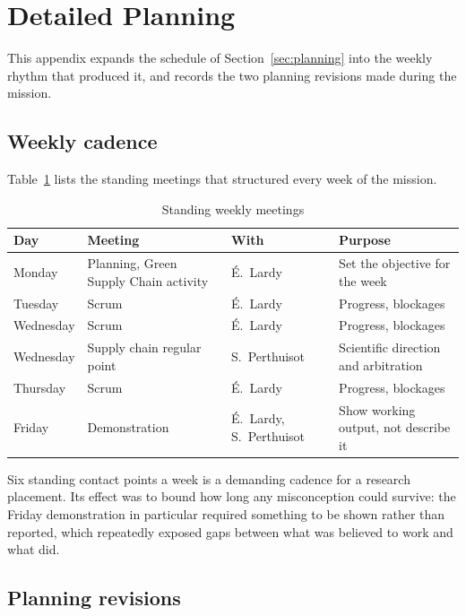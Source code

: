\section{Detailed Planning}
\label{app:planning}

This appendix expands the schedule of Section~\ref{sec:planning} into the weekly rhythm that
produced it, and records the two planning revisions made during the mission.

\subsection*{Weekly cadence}

Table~\ref{tab:cadence} lists the standing meetings that structured every week of the
mission.

\begin{table}[htbp]
\centering
\caption{Standing weekly meetings}
\label{tab:cadence}
\small
\begin{tabularx}{\linewidth}{>{\raggedright\arraybackslash}p{2.2cm} >{\raggedright\arraybackslash}p{3.4cm} >{\raggedright\arraybackslash}p{3.2cm} X}
\toprule
\textbf{Day} & \textbf{Meeting} & \textbf{With} & \textbf{Purpose} \\
\midrule
Monday & Planning, Green Supply Chain activity & \'E.\ Lardy & Set the objective for the
week \\
Tuesday & Scrum & \'E.\ Lardy & Progress, blockages \\
Wednesday & Scrum & \'E.\ Lardy & Progress, blockages \\
Wednesday & Supply chain regular point & S.\ Perthuisot & Scientific direction and
arbitration \\
Thursday & Scrum & \'E.\ Lardy & Progress, blockages \\
Friday & Demonstration & \'E.\ Lardy, S.\ Perthuisot & Show working output, not describe it
\\
\bottomrule
\end{tabularx}
\end{table}

Six standing contact points a week is a demanding cadence for a research placement. Its
effect was to bound how long any misconception could survive: the Friday demonstration in
particular required something to be shown rather than reported, which repeatedly exposed
gaps between what was believed to work and what did.

\subsection*{Planning revisions}

